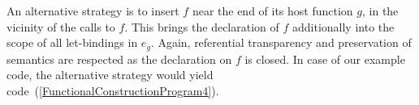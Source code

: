 {An alternative strategy is to insert $f$ near the end of its host
function $g$, in the vicinity of the calls to $f$. This brings the
declaration of $f$ additionally into the scope of all let-bindings in
$e_g$. Again, referential transparency and preservation of semantics
are respected as the declaration on $f$ is closed. In case of our
example code, the alternative strategy would yield
code~(\ref{FunctionalConstructionProgram4}).
}
